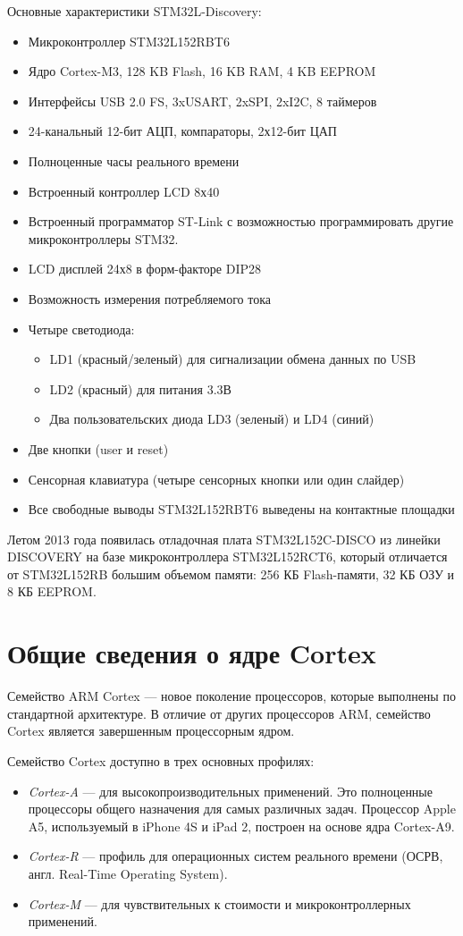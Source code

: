 Основные характеристики STM32L-Discovery:
\begin{itemize}
\item Микроконтроллер STM32L152RBT6
\item Ядро Cortex-M3, 128 KB Flash, 16 KB RAM, 4 KB EEPROM
\item Интерфейсы USB 2.0 FS, 3xUSART, 2xSPI, 2xI2C, 8 таймеров
\item 24-канальный 12-бит АЦП, компараторы, 2х12-бит ЦАП
\item Полноценные часы реального времени
\item Встроенный контроллер LCD 8х40
\item Встроенный программатор ST-Link с возможностью программировать другие микроконтроллеры STM32.
\item LCD дисплей 24х8 в форм-факторе DIP28
\item Возможность измерения потребляемого тока
\item Четыре светодиода:
\begin{itemize}
\item LD1 (красный/зеленый) для сигнализации обмена данных по USB
\item LD2 (красный) для питания 3.3В
\item Два пользовательских диода LD3 (зеленый) и LD4 (синий)
\end{itemize}
\item Две кнопки (user и reset)
\item Сенсорная клавиатура (четыре сенсорных кнопки или один слайдер)
\item Все свободные выводы STM32L152RBT6 выведены на контактные площадки
\end{itemize}

Летом 2013 года появилась отладочная плата STM32L152C-DISCO из линейки DISCOVERY на базе микроконтроллера STM32L152RCT6, который отличается от STM32L152RB большим объемом памяти: 256 КБ Flash-памяти, 32 КБ ОЗУ и 8 КБ EEPROM.



\section{Общие сведения о ядре Cortex}

Семейство ARM Cortex --- новое поколение процессоров, которые выполнены по стандартной архитектуре. В отличие от других процессоров ARM, семейство Cortex является завершенным процессорным ядром. 

Семейство Cortex доступно в трех основных профилях: 
\begin{itemize}
\item \textit{Cortex-A} --- для высокопроизводительных применений. Это полноценные процессоры общего назначения для самых различных задач. Процессор Apple A5, используемый в iPhone 4S и iPad 2, построен на основе ядра Cortex-A9.
\item \textit{Cortex-R} --- профиль для операционных систем реального времени (ОСРВ, англ. Real-Time Operating System).
\item \textit{Cortex-M} --- для чувствительных к стоимости и микроконтроллерных применений. 
\end{itemize}

